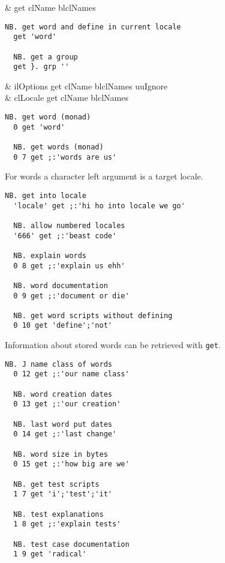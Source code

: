\begin{wordhead}
\monad & get clName \argsep blclNames \\
\end{wordhead}
\begin{lstlisting}[frame=single,framerule=0pt]
  NB. get word and define in current locale
  get 'word'  
  
  NB. get a group  
  get }. grp '' 
\end{lstlisting}

\begin{wordhead}
\dyad & ilOptions get clName \argsep blclNames \argsep uuIgnore \\
      & clLocale get clName \argsep blclNames \\
\end{wordhead}
\begin{lstlisting}[frame=single,framerule=0pt]
  NB. get word (monad)
  0 get 'word'  
  
  NB. get words (monad) 
  0 7 get ;:'words are us' 
\end{lstlisting} 

  For words a character left argument is a target locale.
  
\begin{lstlisting}[frame=single,framerule=0pt]  
  NB. get into locale
  'locale' get ;:'hi ho into locale we go'  
  
  NB. allow numbered locales
  '666' get ;:'beast code'  
    
  NB. explain words
  0 8 get ;:'explain us ehh'  
  
  NB. word documentation
  0 9 get ;:'document or die' 
  
  NB. get word scripts without defining 
  0 10 get 'define';'not' 
\end{lstlisting} 
    
  Information about stored words can be retrieved with \texttt{get}.
  
\begin{lstlisting}[frame=single,framerule=0pt]
  NB. J name class of words
  0 12 get ;:'our name class' 
  
  NB. word creation dates
  0 13 get ;:'our creation'   
  
  NB. last word put dates
  0 14 get ;:'last change'    
  
  NB. word size in bytes
  0 15 get ;:'how big are we' 
  
  NB. get test scripts
  1 7 get 'i';'test';'it'  
     
  NB. test explanations
  1 8 get ;:'explain tests'   
  
  NB. test case documentation
  1 9 get 'radical'   
\end{lstlisting}         

